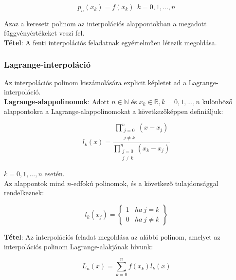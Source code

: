 \documentclass[margin=0px]{article}
\begin{document}
	\begin{displaymath}
		p_{n}(x_{k}) = f(x_{k}) \ \ k=0,1,...,n
	\end{displaymath}
	
	\noindent Azaz a keresett polinom az interpolációs alappontokban a megadott függvényértékeket veszi fel.\\
	
	\noindent \textbf{Tétel}: A fenti interpolációs feladatnak egyértelműen létezik megoldása.\\
	
	\subsubsection{Lagrange-interpoláció}
	Az interpolációs polinom kiszámolására explicit képletet ad a Lagrange-interpoláció.\\
	
	\noindent \textbf{Lagrange-alappolinomok}: Adott $n \in \mathbb{N}$ és $x_{k} \in \mathbb{R}, k=0,1,...,n$ különböző alappontokra
	a Lagrange-alappolinomokat a következőképpen definiáljuk:
	
	\begin{displaymath}
		l_{k}(x) =
		\frac
		{\displaystyle\prod_{\substack{j=0\\j \not = k}}^{n}(x-x_{j})}
		{\displaystyle\prod_{\substack{j=0\\j \not = k}}^{n}(x_{k}-x_{j})}
	\end{displaymath}
	
	\noindent $k=0,1, ..., n$ esetén.\\
	
	\noindent Az alappontok mind $n$-edfokú polinomok, és a következő tulajdonsággal rendelkeznek:
	
	\begin{displaymath}
		l_{k}(x_{j})=\left\{\begin{array}{lr}
		1 & ha \ j=k \\
		0 & ha \ j \not = k
		\end{array}
		\right\}
	\end{displaymath}
	
	\noindent \textbf{Tétel}: Az interpolációs feladat megoldása az alábbi polinom, amelyet az interpolációs
	polinom Lagrange-alakjának hívunk:
	
	\begin{displaymath}
		L_{n}(x) = \sum_{k=0}^{n}f(x_{k})l_{k}(x)
	\end{displaymath}
	
\end{document}
